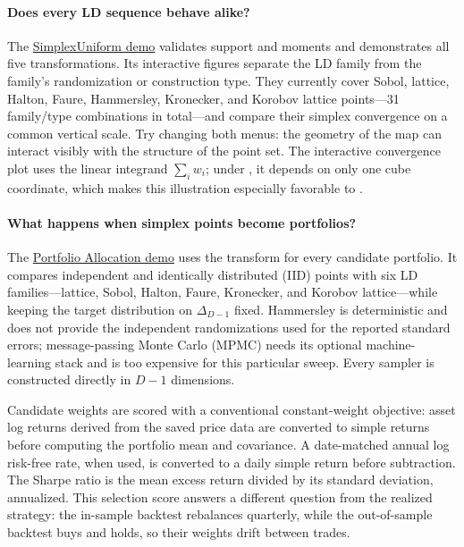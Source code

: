\paragraph{Does every LD sequence behave alike?}
The
\href{https://github.com/QMCSoftware/QMCSoftware/blob/develop/demos/simplex_uniform.ipynb}{SimplexUniform demo}
validates support and moments and demonstrates all five transformations.  Its
interactive figures separate the LD family from the family's
randomization or construction type.  They currently cover Sobol, lattice,
Halton, Faure, Hammersley, Kronecker, and Korobov lattice points---31
family/type combinations in total---and compare their simplex convergence on
a common vertical scale.  Try changing both menus: the geometry of the map
can interact visibly with the structure of the point set.  The interactive
convergence plot uses the linear integrand $\sum_i w_i$; under ,
it depends on only one cube coordinate, which makes this illustration
especially favorable to .

\paragraph{What happens when simplex points become portfolios?}
The
\href{https://github.com/QMCSoftware/QMCSoftware/blob/develop/demos/portfolio/portfolio_allocation_demo.ipynb}{Portfolio Allocation demo}
uses the  transform for every candidate portfolio.  It compares
independent and identically distributed (IID) points
with six LD families---lattice, Sobol, Halton, Faure, Kronecker,
and Korobov lattice---while keeping the target distribution on
$\Delta_{D-1}$ fixed.  Hammersley is deterministic and does not provide the
independent randomizations used for the reported standard errors;
message-passing Monte Carlo (MPMC) needs its optional machine-learning stack
and is too expensive for this particular sweep.  Every sampler is constructed
directly in $D-1$ dimensions.

Candidate weights are scored with a conventional constant-weight objective:
asset log returns derived from the saved price data are converted to simple
returns before computing the portfolio mean and covariance.  A date-matched annual log risk-free rate,
when used, is converted to a daily simple return before subtraction.  The
Sharpe ratio is the mean excess return divided by its standard deviation,
annualized.  This selection score answers a different question from the realized
strategy: the in-sample backtest rebalances quarterly, while the out-of-sample
backtest buys and holds, so their weights drift between trades.

